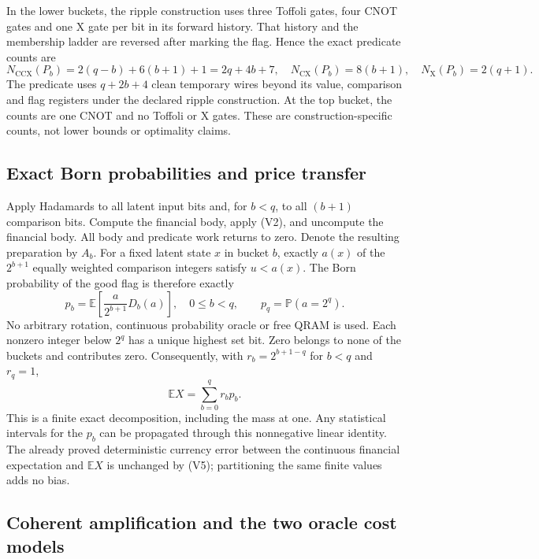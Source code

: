 In the lower buckets, the ripple construction uses three Toffoli gates,
four CNOT gates and one X gate per bit in its forward history. That history
and the membership ladder are reversed after marking the flag. Hence the
exact predicate counts are
\[
 N_{\mathrm{CCX}}(P_b)=2(q-b)+6(b+1)+1=2q+4b+7,
 \quad N_{\mathrm{CX}}(P_b)=8(b+1),
 \quad N_{\mathrm X}(P_b)=2(q+1).                          \tag{V3}
\]
The predicate uses \(q+2b+4\) clean temporary wires beyond its value,
comparison and flag registers under the declared ripple construction.
At the top bucket, the counts are one CNOT and no Toffoli or X gates.
These are construction-specific counts, not lower bounds or optimality claims.

\subsection{Exact Born probabilities and price transfer}

Apply Hadamards to all latent input bits and, for \(b<q\), to all
\((b+1)\) comparison bits. Compute the financial body, apply (V2),
and uncompute the financial body. All body and predicate work returns to
zero. Denote the resulting preparation by \(A_b\). For a fixed latent
state \(x\) in bucket \(b\), exactly \(a(x)\) of the
\(2^{b+1}\) equally weighted comparison integers satisfy \(u<a(x)\).
The Born probability of the good flag is therefore exactly
\[
 p_b=\mathbb E\!\left[
    \frac{a}{2^{b+1}}D_b(a)\right],\quad 0\leq b<q,
 \qquad p_q=\mathbb P(a=2^q).                             \tag{V4}
\]
No arbitrary rotation, continuous probability oracle or free QRAM is used.
Each nonzero integer below \(2^q\) has a unique highest set bit.
Zero belongs to none of the buckets and contributes zero. Consequently,
with \(r_b=2^{b+1-q}\) for \(b<q\) and \(r_q=1\),
\[
 \mathbb E X=\sum_{b=0}^{q}r_b p_b.                       \tag{V5}
\]
This is a finite exact decomposition, including the mass at one. Any
statistical intervals for the \(p_b\) can be propagated through this
nonnegative linear identity. The already proved deterministic currency
error between the continuous financial expectation and \(\mathbb E X\)
is unchanged by (V5); partitioning the same finite values adds no bias.

\subsection{Coherent amplification and the two oracle cost models}

